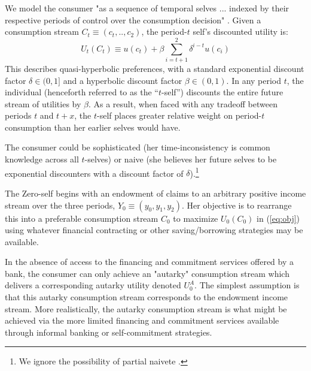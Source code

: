 \documentclass[11pt,english]{article}
\theoremstyle{plain}
\theoremstyle{definition}
\begin{document}
We model the consumer "as a sequence of temporal selves ... indexed
by their respective periods of control over the consumption decision"
\citep[p.451]{laibson1997}. Given a consumption stream $C_{t}\equiv\left(c_{t},..,c_{2}\right)$,
the period-$t$ self's discounted utility is: 
\begin{equation}
U_{t}\left(C_{t}\right)\equiv u\left(c_{t}\right)+\beta\sum\limits _{i=t+1}^{2}\delta^{i-t}u\left(c_{i}\right)\label{eq:obj}
\end{equation}
This describes quasi-hyperbolic preferences, with a standard exponential
discount factor $\delta\in(0,1]$ and a hyperbolic discount factor
$\beta\in(0,1)$. In any period $t$, the individual (henceforth referred
to as the ``$t$-self'') discounts the entire future stream of utilities
by $\beta$. As a result, when faced with any tradeoff between periods $t$ and $t+x$, the $t$-self places greater relative
weight on period-$t$ consumption than her earlier selves would have. 

The consumer could be sophisticated (her time-inconsistency
is common knowledge across all $t$-selves) or naive (she believes
her future selves to be exponential discounters with a discount factor
of $\delta$).\footnote{We ignore the possibility of partial naivete \citep[see][]{odonoghue2001}.}

The Zero-self begins with an endowment of claims to an arbitrary positive
income stream over the three periods, $Y_{0}\equiv\left(y_{0},y_{1},y_{2}\right)$.
Her objective is to rearrange this into a preferable consumption stream
$C_{0}$ to maximize $U_{0}(C_{0})$ in (\ref{eq:obj}) using whatever
financial contracting or other saving/borrowing strategies may
be available.

In the absence of access to the financing and commitment services
offered by a bank, the consumer can only achieve an "autarky" consumption
stream which delivers a corresponding autarky utility denoted $U_{0}^{A}$.
The simplest assumption is that this autarky consumption stream corresponds
to the endowment income stream. More realistically, the autarky consumption
stream is what might be achieved via the more limited financing and
commitment services available through informal banking or self-commitment
strategies.
\end{document}
